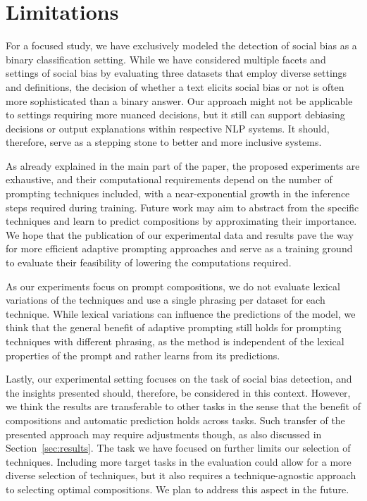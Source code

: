 \section*{Limitations}
\label{sec:limitations}

For a focused study, we have exclusively modeled the detection of social bias as a binary classification setting. While we have considered multiple facets and settings of social bias by evaluating three datasets that employ diverse settings and definitions, the decision of whether a text elicits social bias or not is often more sophisticated than a binary answer. Our approach might not be applicable to settings requiring more nuanced decisions, but it still can support debiasing decisions or output explanations within respective NLP systems. It should, therefore, serve as a stepping stone to better and more inclusive systems.

As already explained in the main part of the paper, the proposed experiments are exhaustive, and their computational requirements depend on the number of  prompting techniques included, with a near-exponential growth in the inference steps required during training. Future work may aim to abstract from the specific techniques and learn to predict compositions by approximating their importance. We hope that the publication of our experimental data and results pave the way for more efficient adaptive prompting approaches and serve as a training ground to evaluate their feasibility of lowering the computations required.

As our experiments focus on prompt compositions, we do not evaluate lexical variations of the techniques and use a single phrasing per dataset for each technique. While lexical variations can influence the predictions of the model, we think that the general benefit of adaptive prompting still holds for prompting techniques with different phrasing, as the method is independent of the lexical properties of the prompt and rather learns from its predictions.

Lastly, our experimental setting focuses on the task of social bias detection, and the insights presented should, therefore, be considered in this context. However, we think the results are transferable to other tasks in the sense that the benefit of compositions and automatic prediction holds across tasks. Such transfer of the presented approach may require adjustments though, as also discussed in Section~\ref{sec:results}. The task we have focused on further limits our selection of techniques. Including more target tasks in the evaluation could allow for a more diverse selection of techniques, but it also requires a technique-agnostic approach to selecting optimal compositions. We plan to address this aspect in the future.
